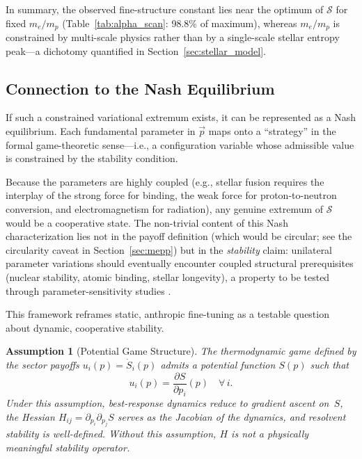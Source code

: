 \documentclass[12pt,a4paper]{article}
\newtheorem{assumption}{Assumption}
\theoremstyle{remark}
\begin{document}
In summary, the observed fine-structure constant lies near the optimum of $\mathcal{S}$ for fixed $m_e/m_p$ (Table~\ref{tab:alpha_scan}: 98.8\% of maximum), whereas $m_e/m_p$ is constrained by multi-scale physics rather than by a single-scale stellar entropy peak---a dichotomy quantified in Section~\ref{sec:stellar_model}.

\subsection{Connection to the Nash Equilibrium}

If such a constrained variational extremum exists, it can be represented as a Nash equilibrium. Each fundamental parameter in $\vec{p}$ maps onto a ``strategy'' in the formal game-theoretic sense---i.e., a configuration variable whose admissible value is constrained by the stability condition.

Because the parameters are highly coupled (e.g., stellar fusion requires the interplay of the strong force for binding, the weak force for proton-to-neutron conversion, and electromagnetism for radiation), any genuine extremum of $\mathcal{S}$ would be a cooperative state. The non-trivial content of this Nash characterization lies not in the payoff definition (which would be circular; see the circularity caveat in Section~\ref{sec:mepp}) but in the \emph{stability} claim: unilateral parameter variations should eventually encounter coupled structural prerequisites (nuclear stability, atomic binding, stellar longevity), a property to be tested through parameter-sensitivity studies \citep{Adams2019}.

This framework reframes static, anthropic fine-tuning as a testable question about dynamic, cooperative stability.

\begin{assumption}[Potential Game Structure]\label{ass:potential-game}
The thermodynamic game defined by the sector payoffs $u_i(p) = \dot{S}_i(p)$ admits a \emph{potential function} $S(p)$ such that
\[
  u_i(p) = \frac{\partial S}{\partial p_i}(p) \quad \forall\, i.
\]
Under this assumption, best-response dynamics reduce to gradient ascent on~$S$, the Hessian $H_{ij} = \partial_{p_i}\partial_{p_j} S$ serves as the Jacobian of the dynamics, and resolvent stability is well-defined. Without this assumption, $H$ is not a physically meaningful stability operator.
\end{assumption}
\end{document}
